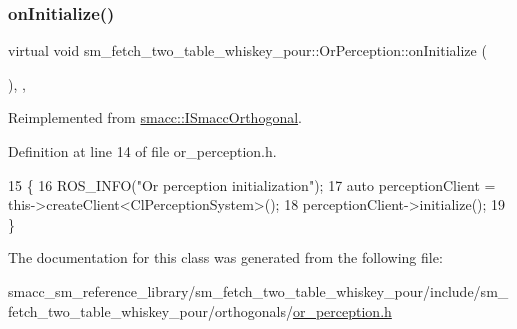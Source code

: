 \subsubsection{\texorpdfstring{on\+Initialize()}{onInitialize()}}
{\footnotesize\ttfamily virtual void sm\+\_\+fetch\+\_\+two\+\_\+table\+\_\+whiskey\+\_\+pour\+::\+Or\+Perception\+::on\+Initialize (\begin{DoxyParamCaption}{ }\end{DoxyParamCaption})\hspace{0.3cm}{\ttfamily [inline]}, {\ttfamily [override]}, {\ttfamily [virtual]}}



Reimplemented from \hyperlink{classsmacc_1_1ISmaccOrthogonal_a6bb31c620cb64dd7b8417f8705c79c7a}{smacc\+::\+I\+Smacc\+Orthogonal}.



Definition at line 14 of file or\+\_\+perception.\+h.


\begin{DoxyCode}
15     \{
16         ROS\_INFO(\textcolor{stringliteral}{"Or perception initialization"});
17         \textcolor{keyword}{auto} perceptionClient = this->createClient<ClPerceptionSystem>();
18         perceptionClient->initialize();
19     \}
\end{DoxyCode}


The documentation for this class was generated from the following file\+:\begin{DoxyCompactItemize}
\item 
smacc\+\_\+sm\+\_\+reference\+\_\+library/sm\+\_\+fetch\+\_\+two\+\_\+table\+\_\+whiskey\+\_\+pour/include/sm\+\_\+fetch\+\_\+two\+\_\+table\+\_\+whiskey\+\_\+pour/orthogonals/\hyperlink{sm__fetch__two__table__whiskey__pour_2include_2sm__fetch__two__table__whiskey__pour_2orthogonals_2or__perception_8h}{or\+\_\+perception.\+h}\end{DoxyCompactItemize}
